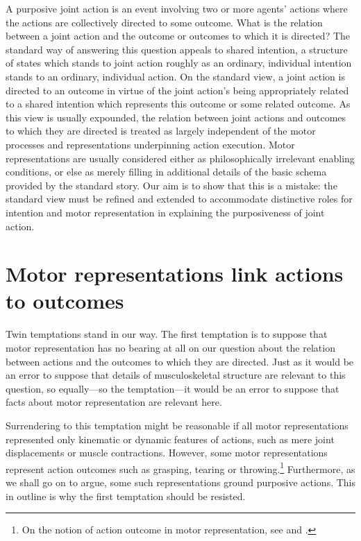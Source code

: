 \documentclass[12pt,\papersize]{extarticle}
\begin{document}
A purposive joint action is an event involving two or more agents' actions where the actions are collectively directed to some outcome.
What is the relation between a joint action and the outcome or outcomes to which it is directed? 
The standard way of answering this question appeals to shared intention,
a structure of states which stands to joint action roughly as an ordinary, individual intention stands to an ordinary, individual action.  
On the standard view, a joint action is directed to an outcome in virtue of the joint action's being appropriately related to a shared intention which represents this outcome or some related outcome. 
As this view is usually expounded, the relation between joint actions and outcomes to which they are directed is treated as largely independent of the motor processes and representations underpinning action execution. 
Motor representations are usually considered either as philosophically irrelevant enabling conditions, or else as merely filling in additional details of the basic schema provided by the standard story. 
Our aim is to show that this is a mistake:
the standard view must be  refined and extended  to accommodate distinctive roles for intention and motor representation in explaining the purposiveness of joint action.




\section{Motor representations link actions to outcomes}

Twin temptations stand in our way.
The first  temptation is to suppose that motor representation has no bearing at all on our question about the relation between actions and the outcomes to which they are directed. Just as it would be an error to suppose that details of musculoskeletal structure are relevant to this question, so equally---so the temptation---it would be an error to suppose that facts about motor representation are relevant here. 

Surrendering to this temptation might be reasonable if all motor representations represented only kinematic or dynamic features of actions, such as mere joint displacements or muscle contractions. However, 
 some motor representations represent action outcomes such as grasping, tearing or throwing.\footnote{ On the notion of action outcome in motor representation, see \citet{jeannerod_motor_2006} and \citet{rizzolatti_mirrors_2008}.}
 Furthermore, as we shall go on to argue, some such representations ground purposive actions. This in outline is why the first temptation should be resisted.
\end{document}
